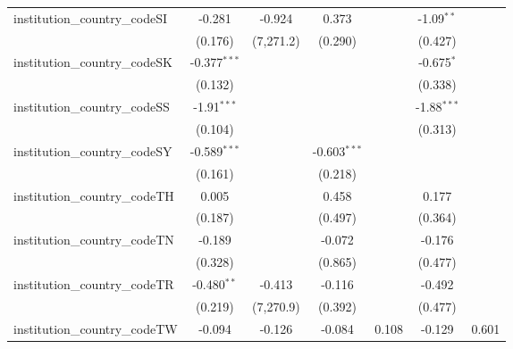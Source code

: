 \begin{tabular}{lcccccc}
   institution\_country\_codeSI          & -0.281         & -0.924        & 0.373          &                & -1.09$^{**}$   &   \\   
                                         & (0.176)        & (7,271.2)     & (0.290)        &                & (0.427)        &   \\   
   institution\_country\_codeSK          & -0.377$^{***}$ &               &                &                & -0.675$^{*}$   &   \\   
                                         & (0.132)        &               &                &                & (0.338)        &   \\   
   institution\_country\_codeSS          & -1.91$^{***}$  &               &                &                & -1.88$^{***}$  &   \\   
                                         & (0.104)        &               &                &                & (0.313)        &   \\   
   institution\_country\_codeSY          & -0.589$^{***}$ &               & -0.603$^{***}$ &                &                &   \\   
                                         & (0.161)        &               & (0.218)        &                &                &   \\   
   institution\_country\_codeTH          & 0.005          &               & 0.458          &                & 0.177          &   \\   
                                         & (0.187)        &               & (0.497)        &                & (0.364)        &   \\   
   institution\_country\_codeTN          & -0.189         &               & -0.072         &                & -0.176         &   \\   
                                         & (0.328)        &               & (0.865)        &                & (0.477)        &   \\   
   institution\_country\_codeTR          & -0.480$^{**}$  & -0.413        & -0.116         &                & -0.492         &   \\   
                                         & (0.219)        & (7,270.9)     & (0.392)        &                & (0.477)        &   \\   
   institution\_country\_codeTW          & -0.094         & -0.126        & -0.084         & 0.108          & -0.129         & 0.601\\   

\end{tabular}
